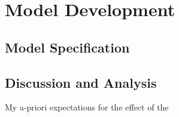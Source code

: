 \section{Model Development}
\subsection{Model Specification}
\subsection{Discussion and Analysis}
My a-priori expectations for the effect of the 